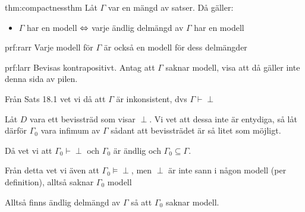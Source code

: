 \par\bigskip
\begin{theo}[Kompakthetssatsen]{thm:compactnessthm}
  Låt $\Gamma$ var en mängd av satser. Då gäller:
  \begin{itemize}
    \item $\Gamma$ har en modell $\Leftrightarrow$ varje ändlig delmängd av $\Gamma$ har en modell
  \end{itemize}
\end{theo}
\par\bigskip
\begin{prf}[$\Rightarrow$]{prf:rarr}
  Varje modell för $\Gamma$ är också en modell för dess delmängder
\end{prf}
\par\bigskip
\begin{prf}[$\Leftarrow$]{prf:larr}
  Bevisas kontrapositivt. Antag att $\Gamma$ saknar modell, visa att då gäller inte denna sida av pilen.
  \par\bigskip
  \noindent Från Sats 18.1 vet vi då att $\Gamma$ är inkonsistent, dvs $\Gamma\vdash\perp$\par
  \noindent Låt $D$ vara ett bevissträd som visar $\perp$. Vi vet att dessa inte är entydiga, så låt därför $\Gamma_0$ vara infimum av $\Gamma$ sådant att bevissträdet är så litet som möjligt.\par
  \noindent Då vet vi att $\Gamma_0\vdash\perp$ och $\Gamma_0$ är ändlig och $\Gamma_0\subseteq\Gamma$.
  \par\bigskip
  \noindent Från detta vet vi även att $\Gamma_0\vDash\perp$, men $\perp$ är inte sann i någon modell (per definition), alltså saknar $\Gamma_0$ modell\par
  \noindent Alltså finns ändlig delmängd av $\Gamma$ så att $\Gamma_0$ saknar modell.
\end{prf}
\par\bigskip
